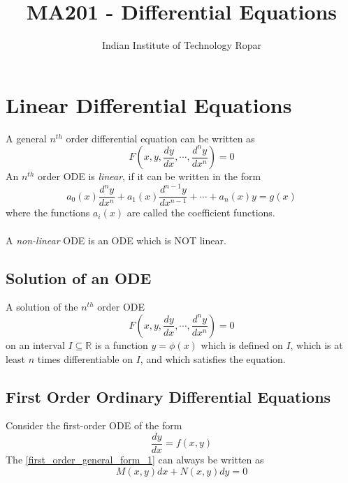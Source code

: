 \documentclass[oneside]{book}
\title{MA201 - Differential Equations}
\author{Indian Institute of Technology Ropar}
\begin{document}
\maketitle
{
	\hypersetup{
		hidelinks
	}
	\tableofcontents
}
\renewcommand{\arraystretch}{1.5}%

\chapter{Linear Differential Equations}
A general \(n^{th}\) order differential equation can be written as
\[
	F(x, y, \frac{dy}{dx}, \cdots, \frac{d^ny}{dx^n}) = 0
\]
An $n^{th}$ order ODE is \textit{linear}, if it can be written in the form
\[
	a_0(x)\frac{d^ny}{dx^n} + a_1(x)\frac{d^{n-1}y}{dx^{n-1}} + \cdots + a_n(x) y = g(x)
\]
where the functions \(a_i(x)\) are called the coefficient functions.
\\\\
\noindent A \textit{non-linear} ODE is an ODE which is NOT linear.

\section{Solution of an ODE}
A solution of the $n^{th}$ order ODE
\[
	F(x, y, \frac{dy}{dx}, \cdots, \frac{d^ny}{dx^n}) = 0
\]
on an interval \(I\subseteq \mathbb{R}\) is a function \(y = \phi(x)\) which is defined on $I$, which is at least $n$ times differentiable on $I$, and which satisfies the equation.

\section{First Order Ordinary Differential Equations}
Consider the first-order ODE of the form
\begin{equation}
	\frac{dy}{dx} = f(x, y)
	\label{first_order_general_form_1}
\end{equation}
The \cref{first_order_general_form_1} can always be written as
\begin{equation}
	M(x, y)dx + N(x, y)dy = 0
	\label{first_order_general_form_2}
\end{equation}
\end{document}
